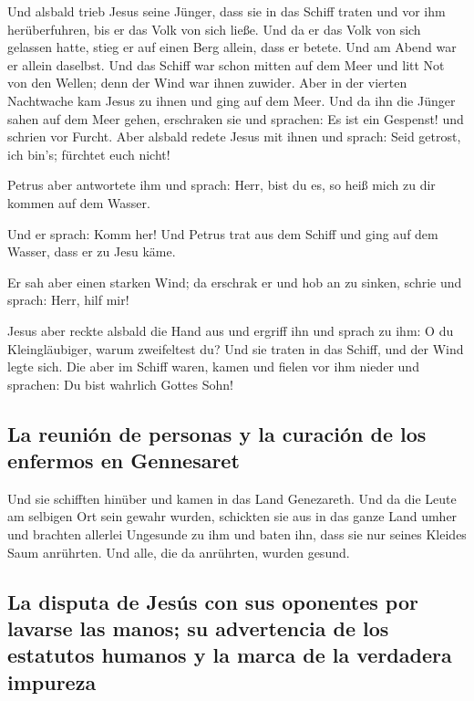  Und alsbald trieb Jesus seine Jünger, dass sie in das
Schiff traten und vor ihm herüberfuhren, bis er das Volk von sich ließe.
 Und da er das Volk von sich gelassen hatte, stieg er auf
einen Berg allein, dass er betete. Und am Abend war er allein daselbst.
 Und das Schiff war schon mitten auf dem Meer und litt
Not von den Wellen; denn der Wind war ihnen zuwider. 
Aber in der vierten Nachtwache kam Jesus zu ihnen und ging auf dem Meer.
 Und da ihn die Jünger sahen auf dem Meer gehen,
erschraken sie und sprachen: Es ist ein Gespenst! und schrien vor
Furcht.  Aber alsbald redete Jesus mit ihnen und sprach:
Seid getrost, ich bin's; fürchtet euch nicht!

 Petrus aber antwortete ihm und sprach: Herr, bist du es,
so heiß mich zu dir kommen auf dem Wasser.

 Und er sprach: Komm her! Und Petrus trat aus dem Schiff
und ging auf dem Wasser, dass er zu Jesu käme.

 Er sah aber einen starken Wind; da erschrak er und hob
an zu sinken, schrie und sprach: Herr, hilf mir!

 Jesus aber reckte alsbald die Hand aus und ergriff ihn
und sprach zu ihm: O du Kleingläubiger, warum zweifeltest du?
 Und sie traten in das Schiff, und der Wind legte sich.
 Die aber im Schiff waren, kamen und fielen vor ihm
nieder und sprachen: Du bist wahrlich Gottes Sohn!

\hypertarget{la-reuniuxf3n-de-personas-y-la-curaciuxf3n-de-los-enfermos-en-gennesaret}{%
\subsection{La reunión de personas y la curación de los enfermos en
Gennesaret}\label{la-reuniuxf3n-de-personas-y-la-curaciuxf3n-de-los-enfermos-en-gennesaret}}

 Und sie schifften hinüber und kamen in das Land
Genezareth.  Und da die Leute am selbigen Ort sein gewahr
wurden, schickten sie aus in das ganze Land umher und brachten allerlei
Ungesunde zu ihm  und baten ihn, dass sie nur seines
Kleides Saum anrührten. Und alle, die da anrührten, wurden gesund.

\hypertarget{la-disputa-de-jesuxfas-con-sus-oponentes-por-lavarse-las-manos-su-advertencia-de-los-estatutos-humanos-y-la-marca-de-la-verdadera-impureza}{%
\subsection{La disputa de Jesús con sus oponentes por lavarse las manos;
su advertencia de los estatutos humanos y la marca de la verdadera
impureza}\label{la-disputa-de-jesuxfas-con-sus-oponentes-por-lavarse-las-manos-su-advertencia-de-los-estatutos-humanos-y-la-marca-de-la-verdadera-impureza}}

